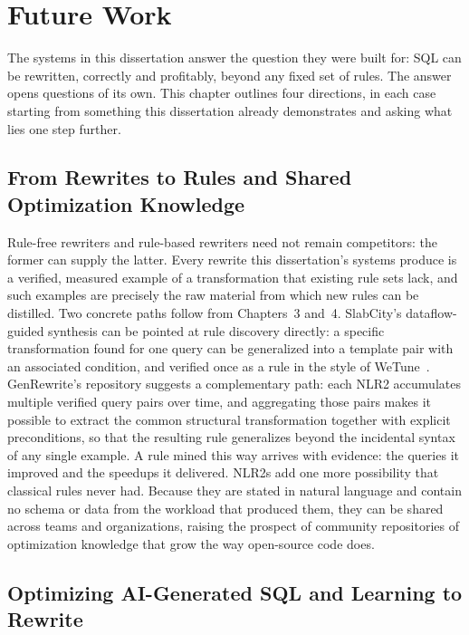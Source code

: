 \chapter{Future Work}
\label{chap:future}

The systems in this dissertation answer the question they were built
for: SQL can be rewritten, correctly and profitably, beyond any fixed
set of rules. The answer opens questions of its own. This chapter
outlines four directions, in each case starting from something this
dissertation already demonstrates and asking what lies one step
further.

\section{From Rewrites to Rules and Shared Optimization Knowledge}
\label{sec:fw:rules}

Rule-free rewriters and rule-based rewriters need not remain
competitors: the former can supply the latter. Every rewrite this
dissertation's systems produce is a verified, measured example of a
transformation that existing rule sets lack, and such examples are
precisely the raw material from which new rules can be distilled. Two
concrete paths follow from Chapters~3 and~4. SlabCity's
dataflow-guided synthesis can be pointed at rule discovery directly:
a specific transformation found for one query can be generalized into
a template pair with an associated condition, and verified once as a
rule in the style of WeTune~\cite{wetune}. GenRewrite's repository
suggests a complementary path: each NLR2 accumulates multiple
verified query pairs over time, and aggregating those pairs makes it
possible to extract the common structural transformation together
with explicit preconditions, so that the resulting rule generalizes
beyond the incidental syntax of any single example. A rule mined this
way arrives with evidence: the queries it improved and the speedups
it delivered. NLR2s add one more possibility that classical rules
never had. Because they are stated in natural language and contain no
schema or data from the workload that produced them, they can be
shared across teams and organizations, raising the prospect of
community repositories of optimization knowledge that grow the way
open-source code does.

\section{Optimizing AI-Generated SQL and Learning to Rewrite}
\label{sec:fw:ai-sql}

